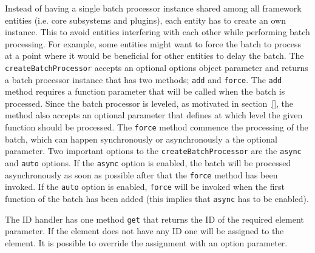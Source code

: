 \documentclass[a4paper,11pt]{kth-mag}
\newcommand{\code}[1]{\texttt{#1}}
\newcommand\abbr[2][]{\uppercase{#2}\ifthenelse{\equal{#1}{}}%
                     {}{#1}}
\begin{document}
          Instead of having a single batch processor instance shared among all framework entities (i.e. core subsystems and plugins), each entity has to create an own instance.
          This to avoid entities interfering with each other while performing batch processing.
          For example, some entities might want to force the batch to process at a point where it would be beneficial for other entities to delay the batch.
          The \code{createBatchProcessor} accepts an optional options object parameter and returns a batch processor instance that has two methods; \code{add} and \code{force}.
          The \code{add} method requires a function parameter that will be called when the batch is processed.
          Since the batch processor is leveled, as motivated in section~\ref{}, the method also accepts an optional parameter that defines at which level the given function should be processed.
          The \code{force} method commence the processing of the batch, which can happen synchronously or asynchronously a the optional parameter.
          Two important options to the \code{createBatchProcessor} are the \code{async} and \code{auto} options.
          If the \code{async} option is enabled, the batch will be processed asynchronously as soon as possible after that the \code{force} method has been invoked.
          If the \code{auto} option is enabled, \code{force} will be invoked when the first function of the batch has been added (this implies that \code{async} has to be enabled).

          The \abbr{ID} handler has one method \code{get} that returns the \abbr{ID} of the required element parameter.
          If the element does not have any \abbr{ID} one will be assigned to the element.
          It is possible to override the assignment with an option parameter.




\end{document}
